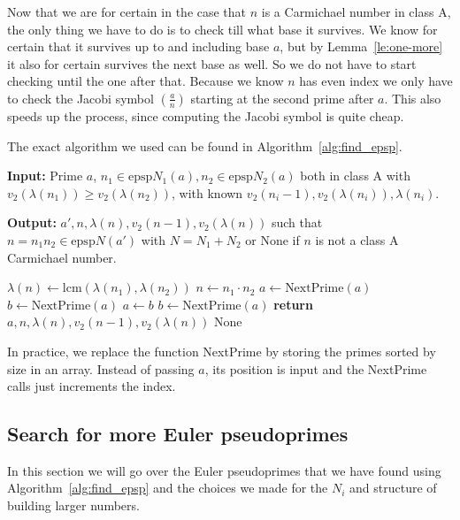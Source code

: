 \documentclass[runningheads]{amsart}
\newcommand{\epsp}{\mathrm{epsp}}
\newcommand{\lcm}{\mathrm{lcm}}
\begin{document}
Now that we are for certain in the case that $n$ is a Carmichael number in class A,
the only thing we have to do is to check till what base it survives.
We know for certain that it survives up to and including
 base
$a$,
but by
Lemma~\ref{le:one-more}
it also for certain survives the next base as well.
So we do not have to start checking until the one after that.
Because we know $n$ has even index we only have to check the Jacobi symbol
 $\left(\frac{a}{n}\right)$
starting at the second prime after $a$.
This also speeds up the process,
since computing the Jacobi symbol is quite cheap.

The exact algorithm we used can be found in
Algorithm~\ref{alg:find_epsp}.

\begin{algorithm}
\caption{\textbf{Finding Class A Euler Pseudoprimes}}
\begin{flushleft}
\textbf{Input:} Prime $a$, $n_1 \in \epsp N_1(a), n_2\in \epsp N_2(a)$  both in class A
with
$v_2(\lambda(n_1))
\geq
v_2(\lambda(n_2))$,
with known
$v_2(n_i-1),
v_2(\lambda(n_i)),
\lambda(n_i)$.
\relax

\textbf{Output:} $a',n, \lambda(n),v_2(n-1),v_2(\lambda(n))$ such that $n = n_1n_2 \in \epsp N(a')$ with $N=N_1+ N_2$ or None if $n$ is not a class A Carmichael number.
\end{flushleft}
\hrulefill
\begin{algorithmic}

\relax
\State $\lambda(n) \gets \lcm(\lambda(n_1),\lambda(n_2))$
\State $n \gets n_1 \cdot n_2$
\State $a \gets \text{NextPrime}(a)$
\State $b \gets \text{NextPrime}(a)$
\State $a \gets b$
\State $b \gets \text{NextPrime}(a)$
\EndWhile
\State \textbf{return} $a,n, \lambda(n),v_2(n-1),v_2(\lambda(n))$
\EndIf
\EndIf
\EndIf
\State \Return None
\end{algorithmic}
\label{alg:find_epsp}
\end{algorithm}

In practice,
we replace the function NextPrime by storing the primes sorted by size in an array.
Instead of passing $a$,
its position is input and the NextPrime calls just increments the index.

\subsection{Search for more Euler pseudoprimes}
In this section we will go over the Euler pseudoprimes that we have found using
Algorithm~\ref{alg:find_epsp}
and the choices we made for the
$N_i$
and structure of building larger numbers.
\end{document}
